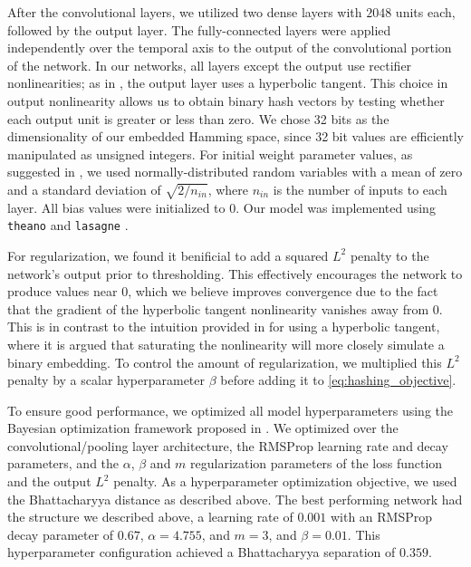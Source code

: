 After the convolutional layers, we utilized two dense layers with $2048$ units each, followed by the output layer.
The fully-connected layers were applied independently over the temporal axis to the output of the convolutional portion of the network.
In our networks, all layers except the output use rectifier nonlinearities; as in \cite{masci2014multimodal}, the output layer uses a hyperbolic tangent.
This choice in output nonlinearity allows us to obtain binary hash vectors by testing whether each output unit is greater or less than zero.
We chose 32 bits as the dimensionality of our embedded Hamming space, since 32 bit values are efficiently manipulated as unsigned integers.
For initial weight parameter values, as suggested in \cite{he2015delving}, we used normally-distributed random variables with a mean of zero and a standard deviation of $\sqrt{2/n_{in}}$, where $n_{in}$ is the number of inputs to each layer.
All bias values were initialized to $0$.
Our model was implemented using \texttt{theano} \cite{bastien2012theano,bergstra2010theano} and \texttt{lasagne} \cite{dieleman2015lasagne}.

For regularization, we found it benificial to add a squared $L^2$ penalty to the network's output prior to thresholding.
This effectively encourages the network to produce values near 0, which we believe improves convergence due to the fact that the gradient of the hyperbolic tangent nonlinearity vanishes away from 0.
This is in contrast to the intuition provided in \cite{masci2014multimodal} for using a hyperbolic tangent, where it is argued that saturating the nonlinearity will more closely simulate a binary embedding.
To control the amount of regularization, we multiplied this $L^2$ penalty by a scalar hyperparameter $\beta$ before adding it to \cref{eq:hashing_objective}.

To ensure good performance, we optimized all model hyperparameters using the Bayesian optimization framework proposed in \cite{snoek2012practical}.
We optimized over the convolutional/pooling layer architecture, the RMSProp learning rate and decay parameters, and the $\alpha$, $\beta$ and $m$ regularization parameters of the loss function and the output $L^2$ penalty.
As a hyperparameter optimization objective, we used the Bhattacharyya distance as described above.
The best performing network had the structure we described above, a learning rate of $0.001$ with an RMSProp decay parameter of $0.67$, $\alpha = 4.755$, and $m = 3$, and $\beta = 0.01$.
This hyperparameter configuration achieved a Bhattacharyya separation of $0.359$.

